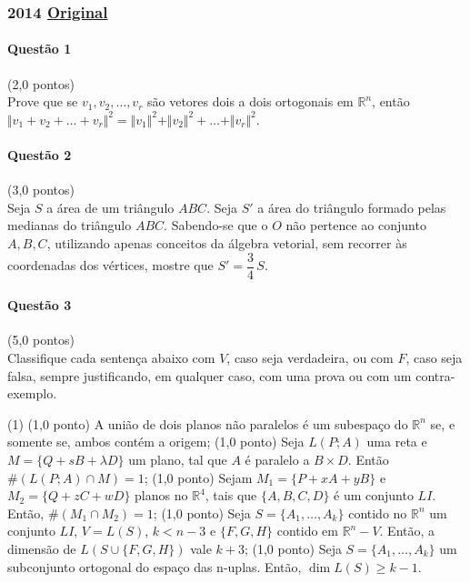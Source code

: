 \documentclass[12pt,a4paper]{article}
\newcommand{\R}{\mathbb{R}}
\newcommand{\norm}[1]{\Vert #1 \Vert}
\newcommand{\original}[1]{\tiny \href{#1}{Original} \normalsize}
\begin{document}
\newpage

\subsubsection{2014 \original{https://drive.google.com/file/d/1pmBk2jC-BNRFREGX4zO421-QUWgot3Hg/view?usp=sharing}}

\paragraph{Questão 1} (2,0 pontos)\\
Prove que se $v_1, v_2, \dots, v_r$ são vetores dois a dois ortogonais em $\R^n$, então $\norm{v_1+v_2+\dots+v_r}^2 = \norm{v_1}^2+\norm{v_2}^2 + \dots + \norm{v_r}^2$.

\paragraph{Questão 2} (3,0 pontos)\\
Seja $S$ a área de um triângulo $ABC$. Seja $S'$ a área do triângulo formado pelas medianas do triângulo $ABC$. Sabendo-se que o $O$ não pertence ao conjunto ${A, B, C}$, utilizando apenas conceitos da álgebra vetorial, sem recorrer às coordenadas dos vértices, mostre que $S'=\dfrac{3}{4} \,S$.

\paragraph{Questão 3} (5,0 pontos)\\
Classifique cada sentença abaixo com $V$, caso seja verdadeira, ou com $F$, caso seja falsa, sempre justificando, em qualquer caso, com uma prova ou com um contra-exemplo.

\begin{tasks}(1)
\task (1,0 ponto) A união de dois planos não paralelos é um subespaço do $\R ^n$ se, e somente se, ambos contém a origem;
\task (1,0 ponto) Seja $L(P;A)$ uma reta e $M=\{Q+sB+\lambda D\}$ um plano, tal que $A$ é paralelo a $B\times D$. Então $\#(L(P;A)\cap M) = 1$;
\task (1,0 ponto) Sejam $M_1 = \{P+xA+yB\}$ e $M_2=\{Q+zC+wD\}$ planos no $\R^4$, tais que $\{A, B, C, D\}$ é um conjunto $LI$. Então, $\#(M_1\cap M_2)=1$;
\task (1,0 ponto) Seja $S=\{A_1, \dots, A_k\}$ contido no $\R^n$ um conjunto $LI$, $V=L(S)$, $k<n-3$ e $\{F,G,H\}$ contido em $\R^n - V$. Então, a dimensão de $L(S\cup \{F, G, H\})$ vale $k+3$;
\task (1,0 ponto) Seja $S=\{A_1, \dots, A_k\}$ um subconjunto ortogonal do espaço das n-uplas. Então, $\dim L(S) \ge k-1$.
\end{tasks}
\newpage
\end{document}

